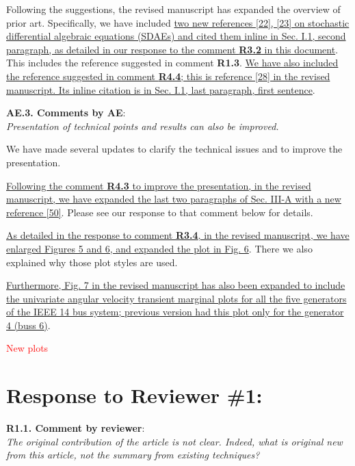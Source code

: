 \documentclass[12pt,onecolumn]{IEEEtran}
\newcommand{\blue}{\color{blue}}
\newcommand{\red}{\textcolor{red}}
\def\spacingset#1{\def\baselinestretch{#1}\small\normalsize}
\newcommand{\nib}{\noindent  {\bf Response:} }
\begin{document}
{\nib {\blue Following the suggestions, the revised manuscript has expanded the overview of prior art. Specifically, we have included \ul{two new references [22], [23] on stochastic differential algebraic equations (SDAEs) and cited them inline in Sec. I.1, second paragraph, as detailed in our response to the comment \textbf{R3.2} in this document}. This includes the reference suggested in comment \textbf{R1.3}. \ul{We have also included the reference suggested in comment \textbf{R4.4}; this is reference [28] in the revised manuscript. Its inline citation is in Sec. I.1, last paragraph, first sentence}.}}


\noindent
{\bf AE.3. Comments by AE}:\\
{\em Presentation of technical points and results can also be improved.}

{\nib {\blue We have made several updates to clarify the technical issues and to improve the presentation.

\ul{Following the comment \textbf{R4.3} to improve the presentation, in the revised manuscript, we have expanded the last two paragraphs of Sec. III-A with a new reference [50]}. Please see our response to that comment below for details. 

\ul{As detailed in the response to comment \textbf{R3.4}, in the revised manuscript, we have enlarged Figures 5 and 6, and expanded the plot in Fig. 6}. There we also explained why those plot styles are used.

\ul{Furthermore, Fig. 7 in the revised manuscript has also been expanded to include the univariate angular velocity transient marginal plots for all the five generators of the IEEE 14 bus system; previous version had this plot only for the generator 4 (buss 6)}.

{\red{New plots}}
}}





\newpage
\spacingset{1}

\section*{\large \bf Response to Reviewer \#1:}


\noindent
{\bf R1.1. Comment by reviewer}:\\
{\em The original contribution of the article is not clear.  Indeed, what is original new from this article, not the summary from existing techniques?}
\end{document}
